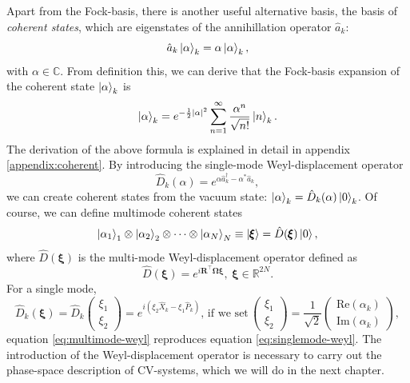 \documentclass[12pt, a4paper,  nobibnotes]{article}
\newcommand{\op}[1]{\hat{#1}}
\begin{document}
Apart from the Fock-basis, there is another useful alternative basis, the basis of \textit{coherent states},
which are eigenstates of the annihillation operator $\op a_k$:
\begin{equation}
    \op a_k \ket{\alpha}_k = \alpha\ket{\alpha}_k,
\end{equation}
with $\alpha\in\mathbb C$. From definition this, we can derive that the Fock-basis expansion of 
the coherent state $\ket\alpha_k$ is
\begin{equation}
    \ket\alpha_k = e^{-\frac{1}{2}|\alpha|^2}\sum\limits_{n=1}^\infty \frac{\alpha^n}{\sqrt{n!}}\ket n_k.
\end{equation}
The derivation of the above formula is explained in detail in appendix \ref{appendix:coherent}. By introducing 
the single-mode Weyl-displacement operator 
\begin{equation}
    \op D_k(\alpha) = e^{\alpha\op a^\dagger_k - \alpha^*\op a_k},
    \label{eq:singlemode-weyl}
\end{equation}
we can create coherent states from the vacuum state: $\ket\alpha_k = \op D_k(\alpha)\ket 0_k$. Of 
course, we can define multimode coherent states 
\begin{equation}
    \ket{\alpha_1}_1 \otimes \ket{\alpha_2}_2 \otimes \cdots \otimes \ket{\alpha_N}_N \equiv \ket{\pmb\xi} = \op D(\pmb\xi) \ket 0,
\end{equation}
where $\op D(\pmb\xi)$ is the multi-mode Weyl-displacement operator defined as
\begin{equation}
    \op D(\pmb\xi) = e^{i\mathbf R^\top\pmb\Omega\pmb\xi}, ~ \pmb\xi \in \mathbb R^{2N}.
    \label{eq:multimode-weyl}
\end{equation}
For a single mode, 
\begin{equation}
    \op D_k(\pmb\xi) = \op D_k\left(\begin{matrix}
        \xi_1 \\ \xi_2
    \end{matrix}\right)
    = e^{i(\xi_2 \op X_k - \xi_1 \op P_k)},\,\textrm{if we set}\,\left(\begin{matrix}
        \xi_1 \\ \xi_2
    \end{matrix}\right) = \frac{1}{\sqrt 2}\left(\begin{matrix}
        \textrm{Re}(\alpha_k) \\ \textrm{Im}(\alpha_k)
    \end{matrix}\right),
\end{equation}
equation \ref{eq:multimode-weyl} reproduces equation \ref{eq:singlemode-weyl}. The introduction
of the Weyl-displacement operator is necessary to carry out the phase-space description
of CV-systems, which we will do in the next chapter.
\end{document}
